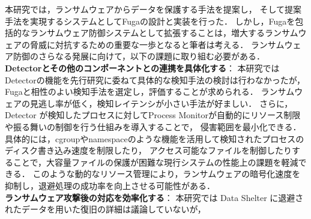 
本研究では，ランサムウェアからデータを保護する手法を提案し，
そして提案手法を実現するシステムとしてFugaの設計と実装を行った．
しかし，Fugaを包括的なランサムウェア防御システムとして拡張することは，増大するランサムウェアの脅威に対抗するための重要な一歩となると筆者は考える．
ランサムウェア防御のさらなる発展に向けて，以下の課題に取り組む必要がある．
\\
\textbf{Detectorとその他のコンポーネントとの連携を具体化する}：
本研究ではDetectorの機能を先行研究に委ねて具体的な検知手法の検討は行わなかったが，Fugaと相性のよい検知手法を選定し，評価することが求められる．
ランサムウェアの見逃し率が低く，検知レイテンシが小さい手法が好ましい．
% 
さらに，Detector が検知したプロセスに対してProcess Monitorが自動的にリソース制限や振る舞いの制御を行う仕組みを導入することで，
侵害範囲を最小化できる．具体的には，cgroupやnamespaceのような機能を活用して検知されたプロセスのディスク書き込み速度を制限したり，
アクセス可能なファイルを制御したりすることで，大容量ファイルの保護が困難な現行システムの性能上の課題を軽減できる．
このような動的なリソース管理により，ランサムウェアの暗号化速度を抑制し，退避処理の成功率を向上させる可能性がある．
\\
\textbf{ランサムウェア攻撃後の対応を効率化する}：
本研究では Data Shelter に退避されたデータを用いた復旧の詳細は議論していないが，

